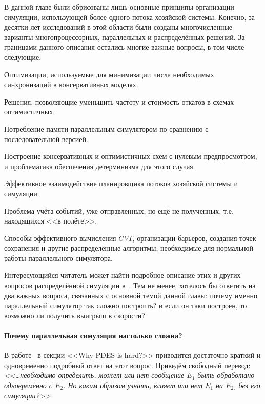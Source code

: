 В данной главе были обрисованы лишь основные принципы организации симуляции, использующей более одного потока хозяйской системы. Конечно, за десятки лет исследований в этой области были созданы многочисленные варианты многопроцессорных, параллельных и распределённых решений. За границами данного описания остались многие важные вопросы, в том числе следующие.

\begin{itemize*}
\item Оптимизации, используемые для минимизации числа необходимых синхронизаций в консервативных моделях. 
\item Решения, позволяющие уменьшить частоту и стоимость откатов в схемах оптимистичных. 
\item Потребление памяти параллельным симулятором по сравнению с последовательной версией.
\item Построение консервативных и оптимистичных схем с нулевым предпросмотром, и проблематика обеспечения детерминизма для этого случая.
\item Эффективное взаимодействие планировщика потоков хозяйской системы и симуляции.
\item Проблема учёта событий, уже отправленных, но ещё не полученных, т.е. находящихся <<в полёте>>.
\item Способы эффективного вычисления $GVT$, организации барьеров, создания точек сохранения и другие распределённые алгоритмы, необходимые для нормальной работы параллельного симулятора.
\end{itemize*}

Интересующийся читатель может найти подробное описание этих и других вопросов распределённой симуляции в~\cite{fujimoto-parallel-dist-sim}. 
Тем не менее, хотелось бы ответить на два важных вопроса, связанных с основной темой данной главы: почему именно параллельный симулятор так сложно построить? и если он таки построен, то возможно ли получить выигрыш в скорости?

\paragraph{Почему параллельная симуляция настолько сложна?}\label{sec:why-pdes-hard}

В работе~\cite{Fujimoto-pdes} в секции <<Why PDES is hard?>> приводится достаточно краткий и одновременно подробный ответ на этот вопрос. Приведём свободный перевод: \textit{<<\dots необходимо определить, может или нет сообщение $E_1$ быть обработано одновременно с $E_2$. Но каким образом узнать, влияет или нет $E_1$ на $E_2$, без его симуляции?>>} 

